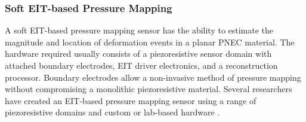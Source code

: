 \subsubsection{Soft EIT-based Pressure Mapping}
\label{subsubsec:eit-based_pressure_mapping}
A soft EIT-based pressure mapping sensor has the ability to estimate the magnitude and location of deformation events in a planar PNEC material. The hardware required usually consists of a piezoresistive sensor domain with attached boundary electrodes, EIT driver electronics, and a reconstruction processor. Boundary electrodes allow a non-invasive method of pressure mapping without compromising a monolithic piezoresistive material. Several researchers have created an EIT-based pressure mapping sensor using a range of piezoresistive domains and custom or lab-based hardware \cite{Russo2017, Nagakubo2007, Silvera-Tawil2015, Yoon2017, Sun2020, Ellingham2024} .

